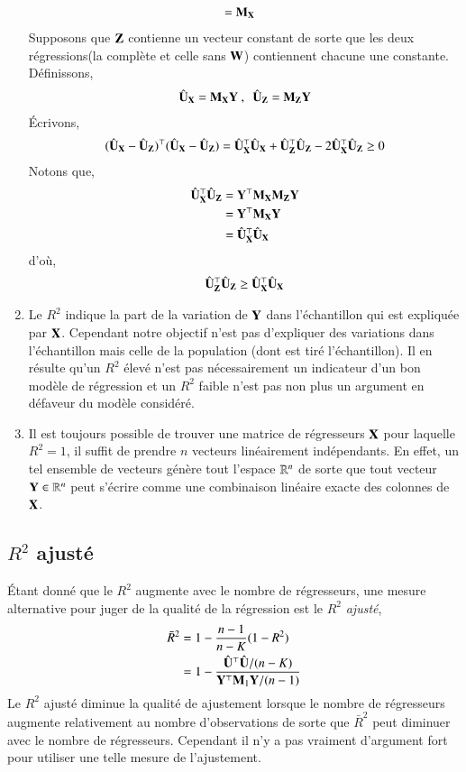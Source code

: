 \documentclass[10pt, reqno]{amsart}
\begin{document}
\begin{enumerate}
\begin{align*}
& = \mathbf M_\mathbf X
\end{align*}
Supposons que $\mathbf Z$ contienne un vecteur constant de sorte que les deux régressions(la complète et celle sans $\mathbf W$) contiennent chacune une constante. Définissons,
\begin{align*}
\hat{\mathbf U}_\mathbf X = \mathbf M_\mathbf X\mathbf Y \ , \ \  
\hat{\mathbf U}_\mathbf Z = \mathbf M_\mathbf Z\mathbf Y
\end{align*}
\'Ecrivons,
\begin{align*}
(\hat{\mathbf U}_\mathbf X - \hat{\mathbf U}_\mathbf Z)^\top(\hat{\mathbf U}_\mathbf X - \hat{\mathbf U}_\mathbf Z) = \hat{\mathbf U}_\mathbf X^\top \hat{\mathbf U}_\mathbf X + \hat{\mathbf U}_\mathbf Z^\top\hat{\mathbf U}_\mathbf Z -2\hat{\mathbf U}_\mathbf X ^\top\hat{\mathbf U}_\mathbf Z\geq 0
\end{align*}
Notons que,
\begin{align*}
\hat{\mathbf U}_\mathbf X ^\top\hat{\mathbf U}_\mathbf Z  &= \mathbf Y^\top\mathbf M_\mathbf X\mathbf M_\mathbf Z\mathbf Y\\
& = 
\mathbf Y^\top\mathbf M_\mathbf X\mathbf Y\\
& = \hat{\mathbf U}_\mathbf X^\top\hat{\mathbf U}_\mathbf X
\end{align*}
d'où,
\begin{align*}
\hat{\mathbf U}_\mathbf Z^\top\hat{\mathbf U}_\mathbf Z\geq \hat{\mathbf U}_\mathbf X^\top\hat{\mathbf U}_\mathbf X
\end{align*}
\item Le $R^2$ indique la part de la variation de $\mathbf Y$ dans l'échantillon qui est expliquée par $\mathbf X$. Cependant notre objectif n'est pas d'expliquer des variations dans l'échantillon mais celle de la population (dont est tiré l'échantillon). Il en résulte qu'un $R^2$ élevé n'est pas nécessairement un indicateur d'un bon modèle de régression et un $R^2$ faible n'est pas non plus un argument en défaveur du modèle considéré.
\item Il est toujours possible de trouver une matrice de régresseurs $\mathbf X$ pour laquelle $R^2 = 1$, il suffit de prendre $n$ vecteurs linéairement indépendants. En effet, un tel ensemble de vecteurs génère tout l'espace $\mathbb{R}^n$ de sorte que tout vecteur $\mathbf Y\in\mathbb{R}^n$ peut s'écrire comme une combinaison linéaire exacte des colonnes de $\mathbf X$.
\end{enumerate}

\subsection{$R^2$ ajusté}
\'Etant donné que le $R^2$ augmente avec le nombre de régresseurs, une mesure alternative pour juger de la qualité de la régression est le $R^2$ \emph{ajusté},
\begin{align*}
\bar{R}^2 &= 1 - \frac{n-1}{n-K}(1 - R^2)\\
& = 1 - \frac{\hat{\mathbf U}^\top\hat{\mathbf U}/(n-K)}{\mathbf Y^\top\mathbf M_1\mathbf Y/(n-1)}
\end{align*}
Le $R^2$ ajusté diminue la qualité de ajustement lorsque le nombre de régresseurs augmente relativement au nombre d'observations de sorte que $\bar{R}^2 $ peut diminuer avec le nombre de régresseurs. Cependant il n'y a pas vraiment d'argument fort pour utiliser une telle mesure de l'ajustement.
\end{document}
